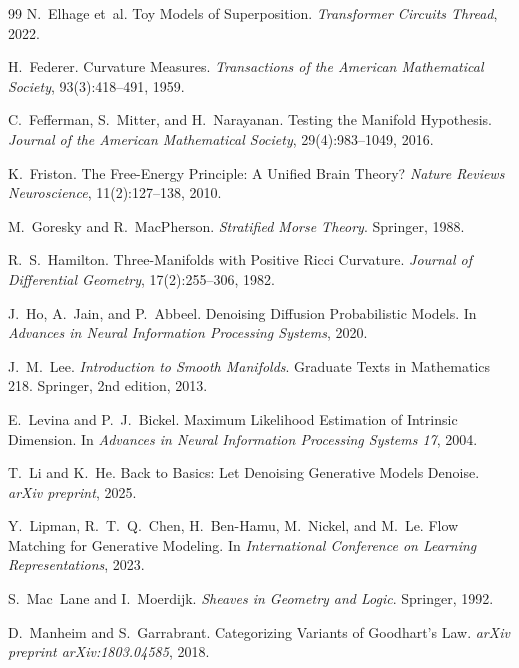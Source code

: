 \documentclass[11pt,a4paper]{article}
\theoremstyle{definition}
\theoremstyle{remark}
\begin{document}
\begin{thebibliography}{99}
N.~Elhage et~al.
\newblock Toy Models of Superposition.
\newblock \emph{Transformer Circuits Thread}, 2022.

H.~Federer.
\newblock Curvature Measures.
\newblock \emph{Transactions of the American Mathematical Society}, 93(3):418--491, 1959.

C.~Fefferman, S.~Mitter, and H.~Narayanan.
\newblock Testing the Manifold Hypothesis.
\newblock \emph{Journal of the American Mathematical Society}, 29(4):983--1049, 2016.

K.~Friston.
\newblock The Free-Energy Principle: A Unified Brain Theory?
\newblock \emph{Nature Reviews Neuroscience}, 11(2):127--138, 2010.

M.~Goresky and R.~MacPherson.
\newblock \emph{Stratified Morse Theory}.
\newblock Springer, 1988.

R.~S.~Hamilton.
\newblock Three-Manifolds with Positive Ricci Curvature.
\newblock \emph{Journal of Differential Geometry}, 17(2):255--306, 1982.

J.~Ho, A.~Jain, and P.~Abbeel.
\newblock Denoising Diffusion Probabilistic Models.
\newblock In \emph{Advances in Neural Information Processing Systems}, 2020.

J.~M.~Lee.
\newblock \emph{Introduction to Smooth Manifolds}.
\newblock Graduate Texts in Mathematics 218. Springer, 2nd edition, 2013.

E.~Levina and P.~J.~Bickel.
\newblock Maximum Likelihood Estimation of Intrinsic Dimension.
\newblock In \emph{Advances in Neural Information Processing Systems 17}, 2004.

T.~Li and K.~He.
\newblock Back to Basics: Let Denoising Generative Models Denoise.
\newblock \emph{arXiv preprint}, 2025.

Y.~Lipman, R.~T.~Q.~Chen, H.~Ben-Hamu, M.~Nickel, and M.~Le.
\newblock Flow Matching for Generative Modeling.
\newblock In \emph{International Conference on Learning Representations}, 2023.

S.~Mac~Lane and I.~Moerdijk.
\newblock \emph{Sheaves in Geometry and Logic}.
\newblock Springer, 1992.

D.~Manheim and S.~Garrabrant.
\newblock Categorizing Variants of Goodhart's Law.
\newblock \emph{arXiv preprint arXiv:1803.04585}, 2018.


\end{thebibliography}
\end{document}
